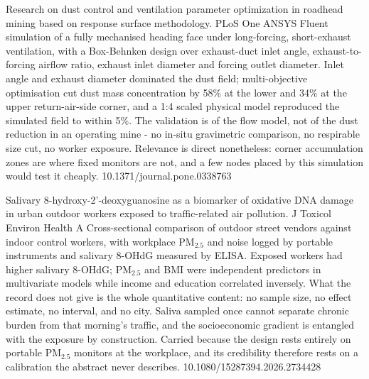 \documentclass[10pt]{article}
\begin{document}

{Research on dust control and ventilation parameter optimization in roadhead mining based on response surface methodology.}
{PLoS One}
{ANSYS Fluent simulation of a fully mechanised heading face under long-forcing, short-exhaust ventilation, with a Box-Behnken design over exhaust-duct inlet angle, exhaust-to-forcing airflow ratio, exhaust inlet diameter and forcing outlet diameter. Inlet angle and exhaust diameter dominated the dust field; multi-objective optimisation cut dust mass concentration by 58\% at the lower and 34\% at the upper return-air-side corner, and a 1:4 scaled physical model reproduced the simulated field to within 5\%. The validation is of the flow model, not of the dust reduction in an operating mine - no in-situ gravimetric comparison, no respirable size cut, no worker exposure. Relevance is direct nonetheless: corner accumulation zones are where fixed monitors are not, and a few nodes placed by this simulation would test it cheaply.}
{10.1371/journal.pone.0338763}

{Salivary 8-hydroxy-2'-deoxyguanosine as a biomarker of oxidative DNA damage in urban outdoor workers exposed to traffic-related air pollution.}
{J Toxicol Environ Health A}
{Cross-sectional comparison of outdoor street vendors against indoor control workers, with workplace PM$_{2.5}$ and noise logged by portable instruments and salivary 8-OHdG measured by ELISA. Exposed workers had higher salivary 8-OHdG; PM$_{2.5}$ and BMI were independent predictors in multivariate models while income and education correlated inversely. What the record does not give is the whole quantitative content: no sample size, no effect estimate, no interval, and no city. Saliva sampled once cannot separate chronic burden from that morning's traffic, and the socioeconomic gradient is entangled with the exposure by construction. Carried because the design rests entirely on portable PM$_{2.5}$ monitors at the workplace, and its credibility therefore rests on a calibration the abstract never describes.}
{10.1080/15287394.2026.2734428}

\end{document}

